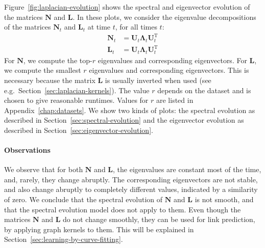\documentclass[11pt,a4paper]{book}
\newcommand{\syRank}{r}
\begin{document}
Figure~\ref{fig:laplacian-evolution} shows the spectral and eigenvector
evolution of the matrices $\mathbf N$ and $\mathbf L$.  In these plots,
we consider the eigenvalue decompositions of the matrices $\mathbf N_t$
and $\mathbf L_t$ at time $t$, for all times $t$:
\begin{align}
  \mathbf N_t &= \mathbf U_t^{\phantom{\mathrm I}} \mathbf
  \Lambda_t^{\phantom{\mathrm I}} \mathbf U_t^{\mathrm T} \\  
  \mathbf L_t &= \mathbf U_t^{\phantom{\mathrm I}} \mathbf
  \Lambda_t^{\phantom{\mathrm I}} \mathbf U_t^{\mathrm T}  
\end{align}
For $\mathbf N$, we compute the top-$\syRank$ eigenvalues and corresponding
eigenvectors. 
For $\mathbf L$, we compute the smallest $\syRank$ eigenvalues and corresponding
eigenvectors.  This is necessary because the matrix $\mathbf L$ is usually
inverted when used (see e.g.\ Section~\ref{sec:laplacian-kernels}). 
The value $\syRank$ depends on the dataset and is chosen to give reasonable
runtimes. Values for $\syRank$ are listed in Appendix~\ref{chap:datasets}. 
We show two kinds of plots:  the spectral evolution as described in
Section~\ref{sec:spectral-evolution} and the eigenvector evolution as
described in Section~\ref{sec:eigenvector-evolution}. 

\paragraph{Observations}
We observe that for both $\mathbf N$ and $\mathbf L$, the eigenvalues
are constant most of the time, and, rarely, they change abruptly.  The
corresponding eigenvectors are not stable, and also change abruptly to
completely different values, indicated by a similarity of zero. 
We conclude that the spectral evolution of $\mathbf N$ and $\mathbf L$
is not smooth, and that the spectral evolution model does not apply to
them.
Even though the matrices $\mathbf N$ and $\mathbf L$ do not change
smoothly, they can be used for link prediction, by applying graph
kernels to them.  This will be explained in
Section~\ref{sec:learning-by-curve-fitting}.  
\end{document}
